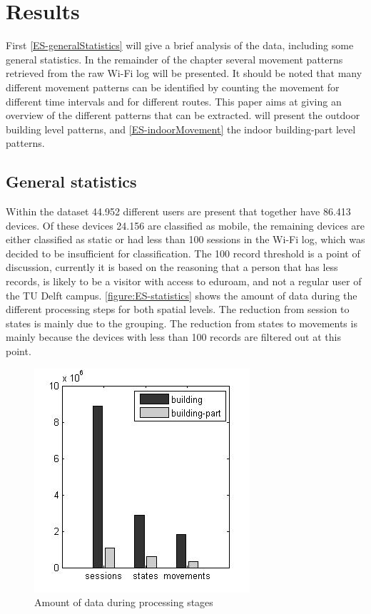 \section{Results}\label{3-results}
First \autoref{ES-generalStatistics} will give a brief analysis of the data, including some general statistics. In the remainder of the chapter several movement patterns retrieved from the raw Wi-Fi log will be presented. It should be noted that many different movement patterns can be identified by counting the movement for different time intervals and for different routes. This paper aims at giving an overview of the different patterns that can be extracted.  will present the outdoor building level patterns, and \autoref{ES-indoorMovement} the indoor building-part level patterns.

\subsection{General statistics}\label{ES-generalStatistics}
Within the dataset 44.952 different users are present that together have 86.413 devices. Of these devices 24.156 are classified as mobile, the remaining devices are either classified as static or had less than 100 sessions in the Wi-Fi log, which was decided to be insufficient for classification. The 100 record threshold is a point of discussion, currently it is based on the reasoning that a person that has less records, is likely to be a visitor with access to eduroam, and not a regular user of the TU Delft campus. \autoref{figure:ES-statistics} shows the amount of data during the different processing steps for both spatial levels. The reduction from session to states is mainly due to the grouping. The reduction from states to movements is mainly because the devices with less than 100 records are filtered out at this point.

\begin{figure}[H]
\centering
\includegraphics[scale=0.5]{ES-statistics.jpg}
\captionsetup{justification=centering}
\caption{Amount of data during processing stages}
\label{figure:ES-statistics}
\end{figure}

